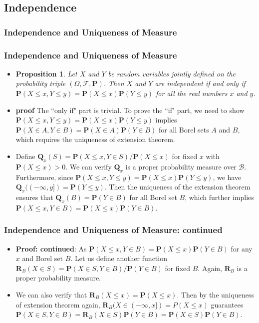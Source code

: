 \documentclass[handout]{beamer}
\newtheorem{Proposition}[theorem]{Proposition}%
\newcommand{\BP}{\mathbf{P}}
\begin{document}
\subsection{Independence}


\subsubsection{Independence and Uniqueness of Measure}
\frame
{
  \frametitle{Independence and Uniqueness of Measure}

   \begin{itemize}

\item<1->[]  
\begin{Proposition}
Let $X$ and $Y$ be random variables jointly defined on the probability triple $(\Omega, \mathcal{F}, \BP)$. Then $X$ and $Y$ are independent if and only if $\BP(X\leq x, Y\leq y)=\BP(X\leq x)\BP (Y\leq y)$ for all the real numbers $x$ and $y$.
\end{Proposition}
             
\item<2->  
\textbf{proof} The ``only if" part is trivial. To prove the ``if" part, we need to show $\BP(X\leq x, Y\leq y)=\BP(X\leq x)\BP (Y\leq y)$ implies $\BP(X\in A, Y\in B)=\BP(X\in A)\BP (Y\in B)$ for all Borel sets $A$ and $B$, which requires the uniqueness of extension theorem. 

\item<3->[-] 
Define $\mathbf{Q}_x(S)=\BP(X\leq x, Y\in S)/\BP(X\leq x)$ for fixed $x$ with $\BP(X\leq x)>0$. We can verify $\mathbf{Q}_x$ is a proper probability measure over $\mathcal{B}$. Furthermore, since $\BP(X\leq x, Y\leq y)=\BP(X\leq x)\BP (Y\leq y)$, we have $\mathbf{Q}_x((-\infty, y])=\mathbf{P}(Y\leq y)$. Then the uniqueness of the extension theorem ensures that $\mathbf{Q}_x(B)=\BP(Y\in B)$ for all Borel set $B$, which further implies $\BP(X\leq x, Y\in B)=\BP(X\leq x)\BP( Y\in B)$. 
                           
\end{itemize}
}


\frame
{
  \frametitle{Independence and Uniqueness of Measure: continued}

   \begin{itemize}

\item<1->  
\textbf{Proof: continued}: As  $\BP(X\leq x, Y\in B)=\BP(X\leq x)\BP( Y\in B)$ for any $x$ and Borel set $B$. Let us define another function $\mathbf{R}_B (X\in S)=\BP(X\in S, Y\in B)/\BP(Y\in B)$ for fixed $B$. Again, $\mathbf{R}_B$ is a proper probability measure. 

\item<2->  We can also verify that $\mathbf{R}_B (X\leq x)=\BP(X\leq x)$. Then by the uniqueness of extension theorem again, $\mathbf{R}_B(X \in (-\infty,x]) = P(X \le x)$ guarantees $\BP(X\in S, Y\in B)=\mathbf{R}_B (X\in S)\BP(Y\in B)=\BP(X\in S)\BP(Y\in B)$.

\end{itemize}
}
\end{document}

